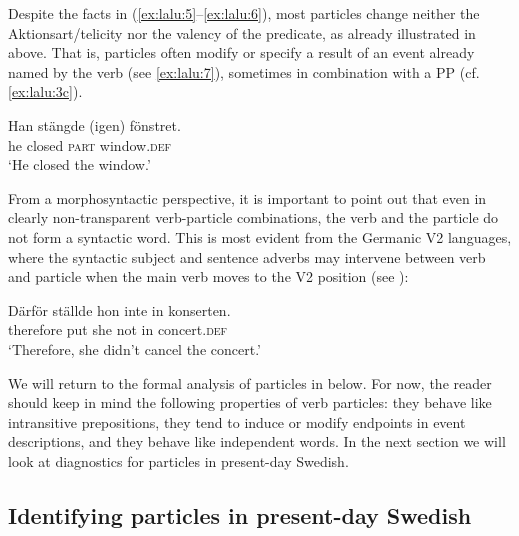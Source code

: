 \documentclass[output=paper]{langscibook}
\begin{document}
\ea\label{ex:lalu:6}
\z
\z

Despite the facts in (\ref{ex:lalu:5}--\ref{ex:lalu:6}), most particles change neither the Aktionsart/telicity nor the valency of the predicate, as already illustrated in  above. That is, particles often modify or specify a result of an event already named by the verb (see \ref{ex:lalu:7}), sometimes in combination with a PP (cf. \ref{ex:lalu:3c}).


\ea\label{ex:lalu:7}
\gll  Han     stängde   (igen)   fönstret.\\
he       closed     \textsc{part}     window.\textsc{def}\\
\glt `He closed the window.'
\z

From a morphosyntactic perspective, it is important to point out that even in clearly non-transparent verb-particle combinations, the verb and the particle do not form a syntactic word. This is most evident from the Germanic V2 languages, where the syntactic subject and sentence adverbs may intervene between verb and particle when the main verb moves to the V2 position (see \citealt{Afarli1985}):


\ea\label{ex:lalu:8}
\gll  Därför   ställde   hon     inte     in   konserten.\\
therefore  put   she   not     in     concert.\textsc{def}\\
\glt `Therefore, she didn’t cancel the concert.'
\z


We will return to the formal analysis of particles in  below. For now, the reader should keep in mind the following properties of verb particles: they behave like intransitive prepositions, they tend to induce or modify endpoints in event descriptions, and they behave like independent words. In the next section we will look at diagnostics for particles in present-day Swedish.


\subsection{Identifying particles in present-day Swedish}\label{sec:lalu:2.2}
\end{document}

